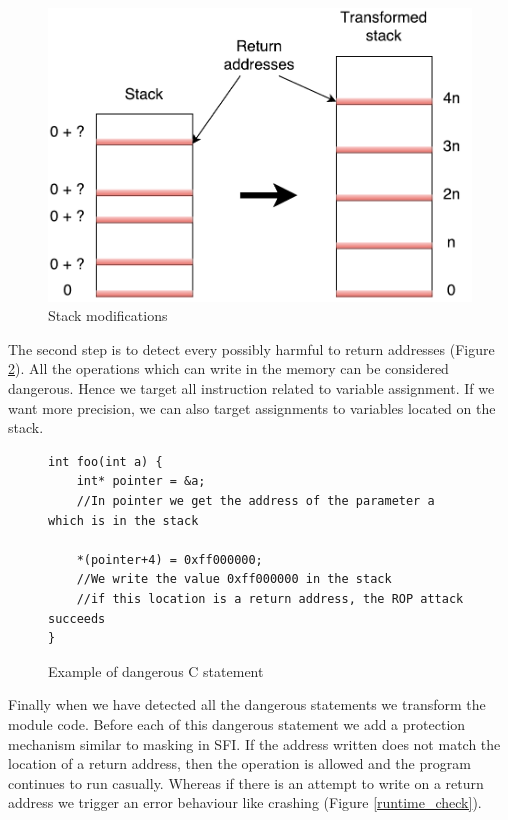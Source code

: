 \documentclass[11pt]{sdm}
\begin{document}
\begin{figure}
\centering
\includegraphics[scale=0.5]{images/stack_transform.pdf}
\caption{Stack modifications}
\label{stack_transform}
\end{figure}

The second step is to detect every possibly harmful to return addresses (Figure \ref{dangerous_statement}). All the operations which can write in the memory can be considered dangerous. Hence we target all instruction related to variable assignment. If we want more precision, we can also target assignments to variables located on the stack.

\begin{figure}
\begin{lstlisting}
int foo(int a) {
	int* pointer = &a;
	//In pointer we get the address of the parameter a which is in the stack

	*(pointer+4) = 0xff000000;
	//We write the value 0xff000000 in the stack
	//if this location is a return address, the ROP attack succeeds
}
\end{lstlisting}
\centering
\caption{Example of dangerous C statement}
\label{dangerous_statement}
\end{figure}

Finally when we have detected all the dangerous statements we transform the module code. Before each of this dangerous statement we add a protection mechanism similar to masking in SFI. If the address written does not match the location of a return address, then the operation is allowed and the program continues to run casually. Whereas if there is an attempt to write on a return address we trigger an error behaviour like crashing (Figure \ref{runtime_check}).
\end{document}
